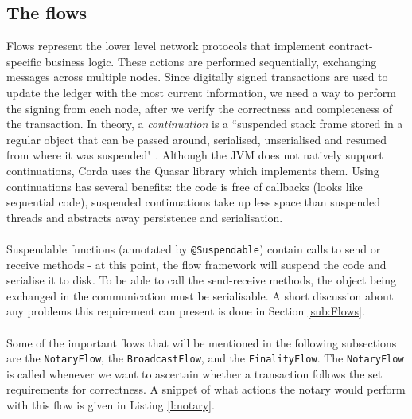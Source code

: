 \documentclass[12pt,twoside]{article}
\begin{document}
\subsection{The flows}
\label{sub:TheFlows}
Flows represent the lower level network protocols that implement contract-specific business logic. These actions are performed sequentially, exchanging messages across multiple nodes. Since digitally signed transactions are used to update the ledger with the most current information, we need a way to perform the signing from each node, after we verify the correctness and completeness of the transaction. In theory, a \textit{continuation} is a ``suspended stack frame stored in a regular object that can be passed around, serialised, unserialised and resumed from where it was suspended" \cite{Corda:docs}. Although the JVM does not natively support continuations, Corda uses the Quasar library which implements them. Using continuations has several benefits: the code is free of callbacks (looks like sequential code), suspended continuations take up less space than suspended threads and abstracts away persistence and serialisation.
\\ \\
Suspendable functions (annotated by \verb|@Suspendable|) contain calls to send or receive methods - at this point, the flow framework will suspend the code and serialise it to disk. To be able to call the send-receive methods, the object being exchanged in the communication must be serialisable. A short discussion about any problems this requirement can present is done in Section \ref{sub:Flows}.
\\ \\
Some of the important flows that will be mentioned in the following subsections are the \verb|NotaryFlow|, the \verb|BroadcastFlow|, and the \verb|FinalityFlow|. The \verb|NotaryFlow| is called whenever we want to ascertain whether a transaction follows the set requirements for correctness. A snippet of what actions the notary would perform with this flow is given in Listing \ref{l:notary}.


\end{document}
